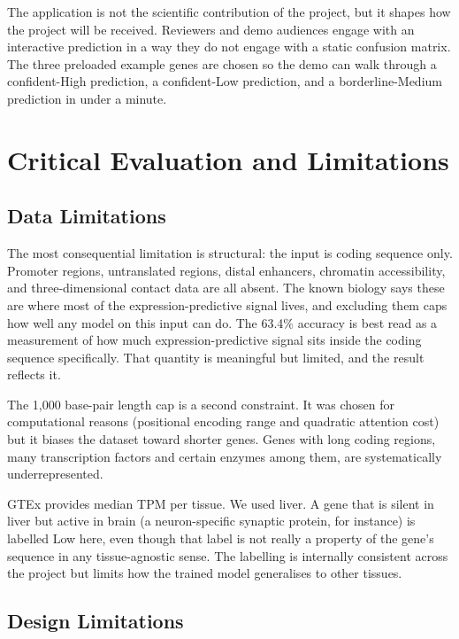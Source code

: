 \documentclass[11pt,a4paper]{article}
\begin{document}
The application is not the scientific contribution of the project, but it shapes how the project will be received. Reviewers and demo audiences engage with an interactive prediction in a way they do not engage with a static confusion matrix. The three preloaded example genes are chosen so the demo can walk through a confident-High prediction, a confident-Low prediction, and a borderline-Medium prediction in under a minute.

\section{Critical Evaluation and Limitations}

\subsection{Data Limitations}

The most consequential limitation is structural: the input is coding sequence only. Promoter regions, untranslated regions, distal enhancers, chromatin accessibility, and three-dimensional contact data are all absent. The known biology says these are where most of the expression-predictive signal lives, and excluding them caps how well any model on this input can do. The 63.4\% accuracy is best read as a measurement of how much expression-predictive signal sits inside the coding sequence specifically. That quantity is meaningful but limited, and the result reflects it.

The 1{,}000 base-pair length cap is a second constraint. It was chosen for computational reasons (positional encoding range and quadratic attention cost) but it biases the dataset toward shorter genes. Genes with long coding regions, many transcription factors and certain enzymes among them, are systematically underrepresented.

GTEx provides median TPM per tissue. We used liver. A gene that is silent in liver but active in brain (a neuron-specific synaptic protein, for instance) is labelled Low here, even though that label is not really a property of the gene's sequence in any tissue-agnostic sense. The labelling is internally consistent across the project but limits how the trained model generalises to other tissues.

\subsection{Design Limitations}
\end{document}
